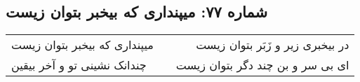 \begin{center}
\section*{شماره ۷۷: میپنداری که بیخبر بتوان زیست}
\label{sec:077}
\begin{longtable}{l p{0.5cm} r}
میپنداری که بیخبر بتوان زیست
&&
در بیخبری زیر و زَبَر بتوان زیست
\\
چندانک نشینی تو و آخر بیقین
&&
ای بی سر و بن چند دگر بتوان زیست
\\
\end{longtable}
\end{center}
